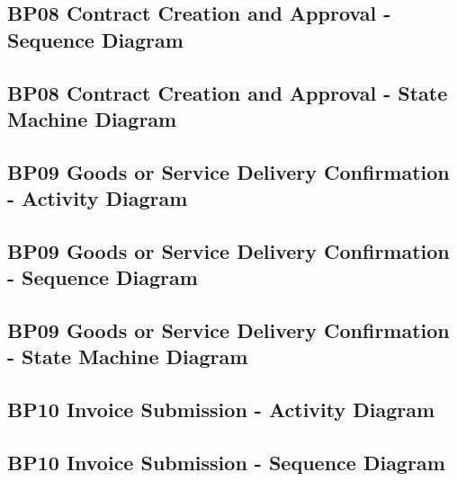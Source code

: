 \documentclass[conference]{IEEEtran}
\begin{document}
\subsection*{BP08 Contract Creation and Approval - Sequence Diagram}



\subsection*{BP08 Contract Creation and Approval - State Machine Diagram}



\subsection*{BP09 Goods or Service Delivery Confirmation - Activity Diagram}



\subsection*{BP09 Goods or Service Delivery Confirmation - Sequence Diagram}



\subsection*{BP09 Goods or Service Delivery Confirmation - State Machine Diagram}



\subsection*{BP10 Invoice Submission - Activity Diagram}



\subsection*{BP10 Invoice Submission - Sequence Diagram}

\end{document}
